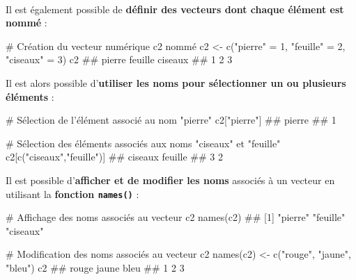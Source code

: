 \documentclass[12pt,twosided, notitlepage]{book}
\newenvironment{Shaded}{}{}
\newcommand{\KeywordTok}[1]{\textcolor[rgb]{0.00,0.00,1.00}{#1}}
\newcommand{\DecValTok}[1]{#1}
\newcommand{\StringTok}[1]{\textcolor[rgb]{0.00,0.50,0.50}{#1}}
\newcommand{\CommentTok}[1]{\textcolor[rgb]{0.00,0.50,0.00}{#1}}
\newcommand{\NormalTok}[1]{#1}
\renewenvironment{Shaded}{\begin{snugshade}}{\end{snugshade}}
\begin{document}
~

Il est également possible de \textbf{définir des vecteurs dont chaque
élément est nommé} :

\begin{Shaded}
\begin{Highlighting}[]
\CommentTok{# Création du vecteur numérique c2 nommé}
\NormalTok{c2 <-}\StringTok{ }\KeywordTok{c}\NormalTok{(}\StringTok{"pierre"}\NormalTok{ =}\StringTok{ }\DecValTok{1}\NormalTok{, }\StringTok{"feuille"}\NormalTok{ =}\StringTok{ }\DecValTok{2}\NormalTok{, }\StringTok{"ciseaux"}\NormalTok{ =}\StringTok{ }\DecValTok{3}\NormalTok{)}
\NormalTok{c2}
\NormalTok{  ##  pierre feuille ciseaux }
\NormalTok{  ##       1       2       3}
\end{Highlighting}
\end{Shaded}

Il est alors possible d'\textbf{utiliser les noms pour sélectionner un
ou plusieurs éléments} :

\begin{Shaded}
\begin{Highlighting}[]
\CommentTok{# Sélection de l'élément associé au nom "pierre"}
\NormalTok{c2[}\StringTok{"pierre"}\NormalTok{]}
\NormalTok{  ## pierre }
\NormalTok{  ##      1}

\CommentTok{# Sélection des éléments associés aux noms "ciseaux" et "feuille"}
\NormalTok{c2[}\KeywordTok{c}\NormalTok{(}\StringTok{"ciseaux"}\NormalTok{,}\StringTok{"feuille"}\NormalTok{)]}
\NormalTok{  ## ciseaux feuille }
\NormalTok{  ##       3       2}
\end{Highlighting}
\end{Shaded}

Il est possible d'\textbf{afficher et de modifier les noms} associés à
un vecteur en utilisant la \textbf{fonction
\texttt{names()}} :

\begin{Shaded}
\begin{Highlighting}[]
\CommentTok{# Affichage des noms associés au vecteur c2}
\KeywordTok{names}\NormalTok{(c2)}
\NormalTok{  ## [1] "pierre"  "feuille" "ciseaux"}

\CommentTok{# Modification des noms associés au vecteur c2}
\KeywordTok{names}\NormalTok{(c2) <-}\StringTok{ }\KeywordTok{c}\NormalTok{(}\StringTok{"rouge"}\NormalTok{, }\StringTok{"jaune"}\NormalTok{, }\StringTok{"bleu"}\NormalTok{)}
\NormalTok{c2}
\NormalTok{  ## rouge jaune  bleu }
\NormalTok{  ##     1     2     3}
\end{Highlighting}
\end{Shaded}
\end{document}
